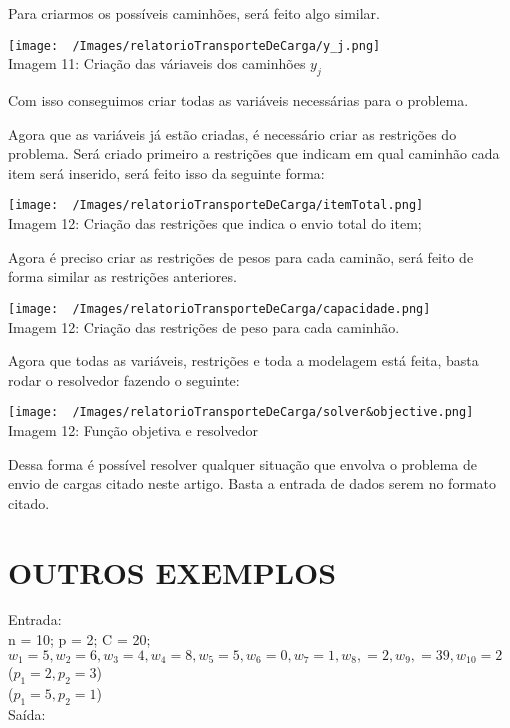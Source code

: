   Para criarmos os possíveis caminhões, será feito algo similar.
  \begin{center}
    \texttt{[image: ~/Images/relatorioTransporteDeCarga/y\_j.png]}\\
    Imagem 11: Criação das váriaveis dos caminhões \(y_{j}\)
  \end{center}
  Com isso conseguimos criar todas as variáveis necessárias para o problema.

  Agora que as variáveis já estão criadas, é necessário criar as restrições do problema.
  Será criado primeiro a restrições que indicam em qual caminhão cada item será inserido, será feito isso da seguinte forma:
  \begin{center}
    \texttt{[image: ~/Images/relatorioTransporteDeCarga/itemTotal.png]}\\
    Imagem 12: Criação das restrições que indica o envio total do item;
  \end{center}
  Agora é preciso criar as restrições de pesos para cada caminão, será feito de forma similar as restrições anteriores.
  \begin{center}
    \texttt{[image: ~/Images/relatorioTransporteDeCarga/capacidade.png]}\\
    Imagem 12: Criação das restrições de peso para cada caminhão.
  \end{center}

  Agora que todas as variáveis, restrições e toda a modelagem está feita, basta rodar o resolvedor fazendo o seguinte:
  \begin{center}
    \texttt{[image: ~/Images/relatorioTransporteDeCarga/solver\&objective.png]}\\
    Imagem 12: Função objetiva e resolvedor
  \end{center}
  Dessa forma é possível resolver qualquer situação que envolva o problema de envio de cargas citado neste artigo. Basta a entrada de dados serem no formato citado.

\chapter{OUTROS EXEMPLOS}

    \noindent Entrada:\\
      \indent n = 10; p = 2; C = 20;\\
      \indent \(w_{1} = 5, w_{2} = 6, w_{3} = 4, w_{4} = 8, w_{5} = 5,
        w_{6} = 0, w_{7} = 1, w_{8}, = 2, w_{9}, = 39, w_{10} = 2\)\\
      \indent (\(p_{1} = 2, p_{2} = 3\))\\
      \indent (\(p_{1} = 5, p_{2} = 1\))\\
    \noindent Saída:\\
        \\


